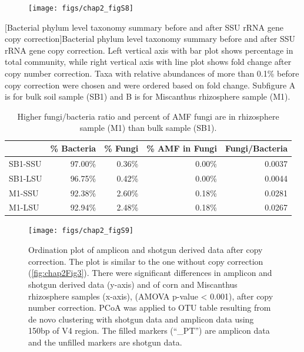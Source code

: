 \documentclass[]{msu-thesis}
\begin{document}
\begin{figure}[tbph!]
  \centering
  \texttt{[image: figs/chap2\_figS8]}
\end{figure}
\clearpage
\SingleSpacing
{}[Bacterial phylum level taxonomy summary before and after SSU rRNA gene copy correction]{Bacterial phylum level taxonomy summary before and after SSU rRNA gene copy correction. Left vertical axis with bar plot shows percentage in total community, while right vertical axis with line plot shows fold change after copy number correction. Taxa with relative abundances of more than 0.1\% before copy correction were chosen and were ordered based on fold change. Subfigure A is for bulk soil sample (SB1) and B is for Miscanthus rhizosphere sample (M1).}
\label{fig:chap2FigS8}
\DoubleSpacing
\bigbreak


\begin{table}[phtb]
  \centering
  \caption[Fungi/bacteria ratio and percent of AMF fungi in rhizosphere and bulk soil samples]{Higher fungi/bacteria ratio and percent of AMF fungi are in rhizosphere sample (M1) than bulk sample (SB1).}
    \begin{tabular}{|l|r|r|r|r|}
    \toprule
          & \multicolumn{1}{l|}{\% Bacteria} & \multicolumn{1}{l|}{\% Fungi} & \multicolumn{1}{l|}{\% AMF in Fungi} & \multicolumn{1}{l|}{Fungi/Bacteria} \\
    \midrule
    SB1-SSU & 97.00\% & 0.36\% & 0.00\% & 0.0037 \\
    \midrule
    SB1-LSU & 96.75\% & 0.42\% & 0.00\% & 0.0044 \\
    \midrule
    M1-SSU & 92.38\% & 2.60\% & 0.18\% & 0.0281 \\
    \midrule
    M1-LSU & 92.94\% & 2.48\% & 0.18\% & 0.0267 \\
    \bottomrule
    \end{tabular}%
  \label{tab:chap2TabS1}%
\end{table}%


\begin{figure}[tbph!]
  \centering
  \texttt{[image: figs/chap2\_figS9]}
  \caption[Ordination plot of amplicon and shotgun derived data after copy correction]{Ordination plot of amplicon and shotgun derived data after copy correction. The plot is similar to the one without copy correction (\cref{fig:chap2Fig3}). There were significant differences in amplicon and shotgun derived data (y-axis) and of corn and Miscanthus rhizosphere samples (x-axis), (AMOVA p-value < 0.001), after copy number correction. PCoA was applied to OTU table resulting from de novo clustering with shotgun data and amplicon data using 150bp of V4 region. The filled markers (``\_PT'') are amplicon data and the unfilled markers are shotgun data.}
  \label{fig:chap2FigS9}
\end{figure}
\end{document}
